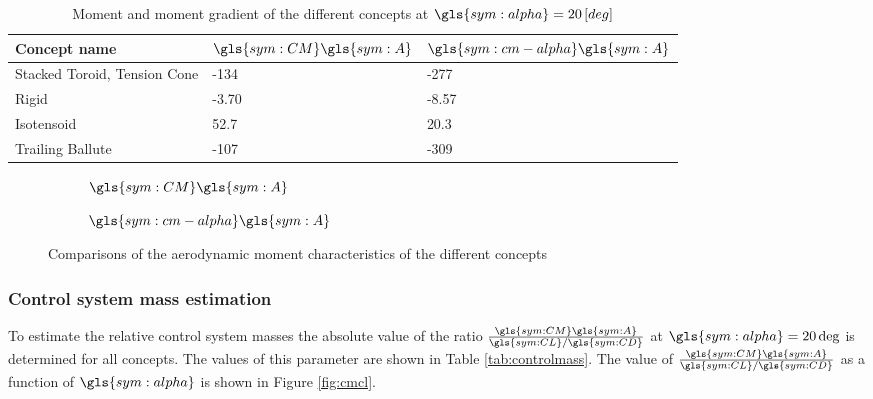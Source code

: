 \begin{table}[H]
	\caption{Moment and moment gradient of the different concepts at $\gls{sym:alpha}=20 \left[deg\right]$}%
	\label{tab:MomentCoeff}%
	\begin{tabular}{|p{}|p{}|p{}|}
		\hline
		Concept name  					& $\gls{sym:CM}\gls{sym:A}$	& $\gls{sym:cm-alpha}\gls{sym:A}$	\\ \hline \hline
		Stacked Toroid, Tension Cone	& -134    		& -277				\\ \hline
		Rigid  							& -3.70			& -8.57				\\ \hline
		Isotensoid  					& 52.7				& 20.3				\\ \hline
		Trailing Ballute				& -107			& -309				\\ \hline				
	\end{tabular}
\end{table} 
 
\begin{figure}[h]
	\centering
	\begin{subfigure}[b]{0.49\textwidth}

		\setlength{} 
		\setlength{}
				

		\caption{$\gls{sym:CM}\gls{sym:A}$}
		\label{fig:cm}
	\end{subfigure}
	\begin{subfigure}[b]{0.49\textwidth}

		\setlength{} 
		\setlength{}
				

		\caption{$\gls{sym:cm-alpha}\gls{sym:A}$}
		\label{fig:cmalpha}
	\end{subfigure}
	\caption{Comparisons of the aerodynamic moment characteristics of the different concepts}
	\label{fig:cmplots}
\end{figure}

\subsubsection{Control system mass estimation}
To estimate the relative control system masses the absolute value of the ratio $\frac{\gls{sym:CM}\gls{sym:A}}{\gls{sym:CL}/\gls{sym:CD}}$ at $\gls{sym:alpha}=20\deg$ is determined for all concepts. The values of this parameter are shown in Table \ref{tab:controlmass}. The value of $\frac{\gls{sym:CM}\gls{sym:A}}{\gls{sym:CL}/\gls{sym:CD}}$ as a function of $\gls{sym:alpha}$ is shown in Figure \ref{fig:cmcl}.

